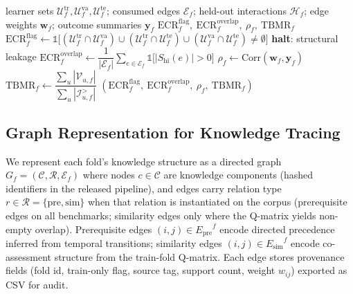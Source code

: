 \documentclass[pdflatex,sn-mathphys-num]{sn-jnl}
\newcommand{\Epre}{\ensuremath{E_{\text{pre}}}}
\newcommand{\Esim}{\ensuremath{E_{\text{sim}}}}
\newcommand{\KCs}{knowledge components}
\newcommand{\rev}[1]{\hl{#1}}
\newcommand{\rev}[1]{#1}
\begin{document}
\begin{algorithm}[t]
\caption{\rev{Edge-provenance leakage audit for fold \mbox{$f$}}}
\label{alg:leak-audit}
\begin{algorithmic}[1]
\Require learner sets $\mathcal{U}^{\mathrm{tr}}_f,\mathcal{U}^{\mathrm{va}}_f,\mathcal{U}^{\mathrm{te}}_f$;
  consumed edges $\mathcal{E}_f$; held-out interactions $\mathcal{H}_f$;
  edge weights $\mathbf{w}_f$; outcome summaries $\mathbf{y}_f$
\Ensure $\mathrm{ECR}^{\mathrm{flag}}_f,\ \mathrm{ECR}^{\mathrm{overlap}}_f,\ \rho_f,\ \mathrm{TBMR}_f$
\State $\mathrm{ECR}^{\mathrm{flag}}_f \gets \mathbb{1}\big[(\mathcal{U}^{\mathrm{tr}}_f\cap\mathcal{U}^{\mathrm{va}}_f)\cup(\mathcal{U}^{\mathrm{tr}}_f\cap\mathcal{U}^{\mathrm{te}}_f)\cup(\mathcal{U}^{\mathrm{va}}_f\cap\mathcal{U}^{\mathrm{te}}_f)\neq\emptyset\big]$
 \State \textbf{halt}: structural leakage \EndIf
\State $\mathrm{ECR}^{\mathrm{overlap}}_f \gets \dfrac{1}{|\mathcal{E}_f|}\sum_{e\in\mathcal{E}_f}\mathbb{1}\big[|S_{\text{hi}}(e)|>0\big]$ 
\State $\rho_f \gets \mathrm{Corr}(\mathbf{w}_f,\mathbf{y}_f)$ 
\State $\mathrm{TBMR}_f \gets \dfrac{\sum_u |\mathcal{V}_{u,f}|}{\sum_u |\mathcal{I}^{>}_{u,f}|}$ 
\State \Return $(\mathrm{ECR}^{\mathrm{flag}}_f,\ \mathrm{ECR}^{\mathrm{overlap}}_f,\ \rho_f,\ \mathrm{TBMR}_f)$
\end{algorithmic}
\end{algorithm}

\subsection{Graph Representation for Knowledge Tracing}
\label{sec:graph-repr}
We represent each fold's knowledge structure as a directed graph
$G_f=(\mathcal{C},\mathcal{R},\mathcal{E}_f)$ where nodes $c\in\mathcal{C}$
are \KCs{} (hashed identifiers in the released pipeline), and edges carry
relation type $r\in\mathcal{R}=\{\text{pre}, \text{sim}\}$ when that
relation is instantiated on the corpus (prerequisite edges on all benchmarks;
similarity edges only where the Q-matrix yields non-empty overlap). Prerequisite edges $(i,j)\in\Epre^f$ encode directed
precedence inferred from temporal transitions; similarity edges
$(i,j)\in\Esim^f$ encode co-assessment structure from the train-fold
Q-matrix. Each edge stores provenance fields (fold id, train-only flag,
source tag, support count, weight $w_{ij}$) exported as CSV for audit.
\end{document}
